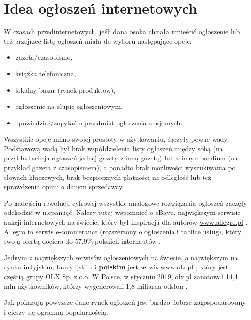 \documentclass[12pt]{article}
\numberwithin{figure}{section}
\begin{document}
\begin{sloppypar}
\pagebreak
\section{Idea ogłoszeń internetowych}
W czasach przedinternetowych, jeśli dana osoba chciała umieścić ogłoszenie lub też przejrzeć listę ogłoszeń miała do wyboru następujące opcje:
\begin{itemize}
    \item gazeta/czasopismo,
    \item książka telefoniczna,
    \item lokalny bazar (rynek produktów),
    \item ogłoszenie na słupie ogłoszeniowym,
    \item opowiedzieć/zapytać o przedmiot ogłoszenia znajomych.
\end{itemize}

Wszystkie opcje mimo swojej prostoty w użytkowaniu, łączyły pewne wady. Podstawową wadą był brak współdzielenia listy ogłoszeń między sobą (na przykład sekcja ogłoszeń jednej gazety z inną gazetą) lub z innym medium (na przykład gazeta z czasopismem), a ponadto brak możliwości wyszukiwania po słowach kluczowych, brak bezpiecznych płatności na odległość lub też sprawdzenia opinii o danym sprzedawcy.

Po nadejściu rewolucji cyfrowej wszystkie analogowe rozwiązania ogłoszeń zaczęły odchodzić w niepamięć. Należy tutaj wspomnieć o eBayu, największym serwisie aukcji internetowych na świecie, który był inspiracją dla autorów \url{www.allegro.pl} \cite{allegro-wywiad}. Allegro to serwis e-commerance (rozszerzony o ogłoszenia i tablice usług), który swoją ofertą dociera do 57,9\% polskich internautów \cite{allegro-liczby}. 

Jednym z największych serwisów ogłoszeniowych na świecie, a największym na rynku indyjskim, brazylijskim i \textbf{polskim} jest serwis \url{www.olx.pl} \cite{olx-wywiad}, który jest częścią grupy OLX Sp. z o.o. W Polsce, w styczniu 2019, olx.pl zanotował 14,4 mln użytkowników, którzy wygenerowali 1,8 miliarda odsłon \cite{olx-liczby}.

Jak pokazują powyższe dane rynek ogłoszeń jest bardzo dobrze zagospodarowany i cieszy się ogromną popularnością.

\end{sloppypar}
\end{document}
